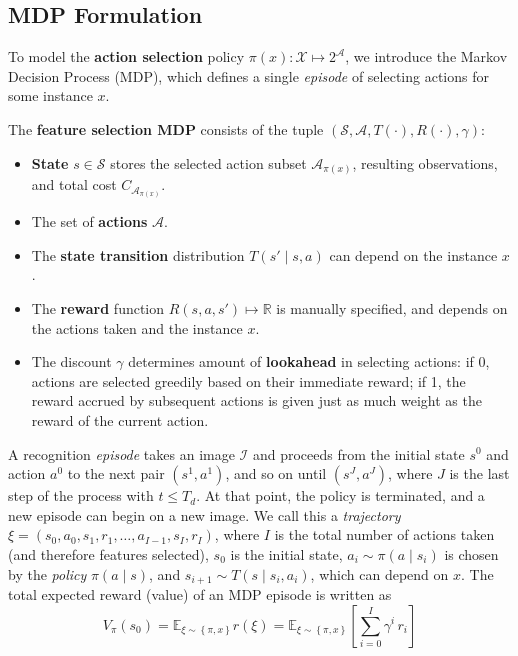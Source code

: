 \subsection{MDP Formulation}\label{sec:mdp_formulation}

To model the \textbf{action selection} policy $\pi(x): \mathcal{X} \mapsto 2^\mathcal{A}$, we introduce the Markov Decision Process (MDP), which defines a single \emph{episode} of selecting actions for some instance $x$.

\begin{mydef} \label{def:MDP}
The \textbf{feature selection MDP} consists of the tuple $(\mathcal{S}, \mathcal{A}, T(\cdot), R(\cdot), \gamma)$:

\begin{itemize}
\item \textbf{State} $s \in \mathcal{S}$ stores the selected action subset $\mathcal{A}_{\pi(x)}$, resulting observations, and total cost $C_{\mathcal{A}_{\pi(x)}}$.
\item The set of \textbf{actions} $\mathcal{A}$.
\item The \textbf{state transition} distribution $T(s' \mid s, a)$ can depend on the instance $x$.
\item The \textbf{reward} function $R(s, a, s') \mapsto \mathbb{R}$ is manually specified, and depends on the actions taken and the instance $x$.
\item The discount $\gamma$ determines amount of \textbf{lookahead} in selecting actions: if 0, actions are selected greedily based on their immediate reward; if 1, the reward accrued by subsequent actions is given just as much weight as the reward of the current action.
\end{itemize}
\end{mydef}

A recognition \emph{episode} takes an image $\mathcal{I}$ and proceeds from the initial state $s^0$ and action $a^0$ to the next pair $(s^1,a^1)$, and so on until $(s^J,a^J)$, where $J$ is the last step of the process with $t \le T_d$.
At that point, the policy is terminated, and a new episode can begin on a new image.
We call this a \emph{trajectory} $\xi = (s_0, a_0, s_1, r_1, \dots, a_{I-1}, s_I, r_I)$, where $I$ is the total number of actions taken (and therefore features selected), $s_0$ is the initial state, $a_i \sim \pi(a \mid s_i)$ is chosen by the \emph{policy} $\pi(a \mid s)$, and $s_{i+1} \sim T(s \mid s_i, a_i)$, which can depend on $x$.
The total expected reward (value) of an MDP episode is written as
\begin{equation}\label{eq:expected_reward}
V_\pi(s_0) =
\mathbb{E}_{\xi \sim \left\{ \pi, x \right\}} r(\xi) =
\mathbb{E}_{\xi \sim \left\{ \pi, x \right\}} \left[ \sum_{i=0}^I \gamma^i \, r_i \right]
\end{equation}

